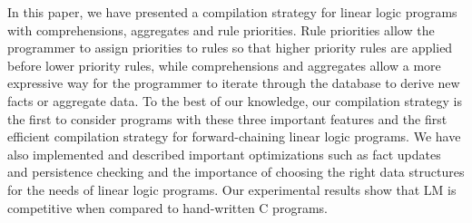 In this paper, we have presented a compilation strategy for linear logic
programs with comprehensions, aggregates and rule priorities. Rule priorities
allow the programmer to assign priorities to rules so that higher priority rules
are applied before lower priority rules, while comprehensions and aggregates
allow a more expressive way for the programmer to iterate through the database
to derive new facts or aggregate data. To the best of our knowledge, our
compilation strategy is the first to consider programs with these three
important features and the first efficient compilation strategy for
forward-chaining linear logic programs.  We have also implemented and described
important optimizations such as fact updates and persistence checking and the
importance of choosing the right data structures for the needs of linear logic
programs.  Our experimental results show that LM is competitive when
compared to hand-written C programs.
